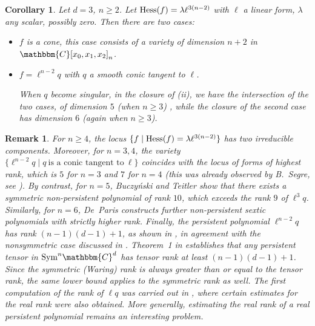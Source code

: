 \documentclass[aps,floatfix,groupedaddress,superscriptaddress,longbibliography,footinbib,notitlepage,showpacs]{revtex4-1}
\def\Hess{{\rm Hess}}
\newtheorem{remark}[theorem]{Remark}
\newtheorem{corollary}[theorem]{Corollary}
\begin{document}
\begin{corollary}
Let $d=3$, $n\geq 2$. Let $\Hess(f)=\lambda\ell^{3(n-2)}$ with $\ell$ a linear form, $\lambda$ any scalar, possibly zero. Then there are two cases:
\begin{itemize}
\item[(i)] $f$ is a cone, this case consists of a variety of dimension $n+2$ in $\mathbbm{C}[x_0,x_1,x_2]_n$.
\item[(ii)] $f=\ell^{n-2}q$ with $q$ a smooth conic tangent to $\ell$. 

When $q$ become singular, in the closure of (ii), we have the intersection of the two cases, of dimension $5$ (when $n\geq 3$) , while the closure of the second case has dimension $6$ (again when $n\geq 3$).
\end{itemize}
\end{corollary}
\begin{remark}
For $n \geq 4$, the locus $\{f\mid\Hess(f)=\lambda\ell^{3(n-2)}\}$ has two irreducible components. Moreover, for $n=3,4$, the variety $\{\ell^{n-2}q\mid q~\textrm{is a conic tangent to}~\ell\}$ coincides with the locus of forms of highest rank, which is $5$ for $n=3$ and $7$ for $n=4$ (this was already observed by B.~Segre, see \cite[\S 97]{Seg42}). By contrast, for $n=5$, Buczyński and Teitler \cite{BT} show that there exists a symmetric non-persistent polynomial of rank $10$, which exceeds the rank $9$ of $\ell^3 q$. Similarly, for $n=6$, De~Paris \cite{DeP} constructs further non-persistent sextic polynomials with strictly higher rank. Finally, the persistent polynomial $\ell^{n-2}q$ has rank $(n-1)(d-1)+1$, as shown in \cite[Proposition~3.7]{CG24}, in agreement with the nonsymmetric case discussed in \cite{GL24}. Theorem~1 in \cite{GL24} establishes that any persistent tensor in $\mathrm{Sym}^n \mathbbm{C}^d$ has tensor rank at least $(n-1)(d-1)+1$. 
Since the symmetric (Waring) rank is always greater than or equal to the tensor rank, the same lower bound applies to the symmetric rank as well. The first computation of the rank of $\ell q$ was carried out in \cite{CGV}, where certain estimates for the real rank were also obtained. More generally, estimating the real rank of a real persistent polynomial remains an interesting problem.
\end{remark}
\end{document}
